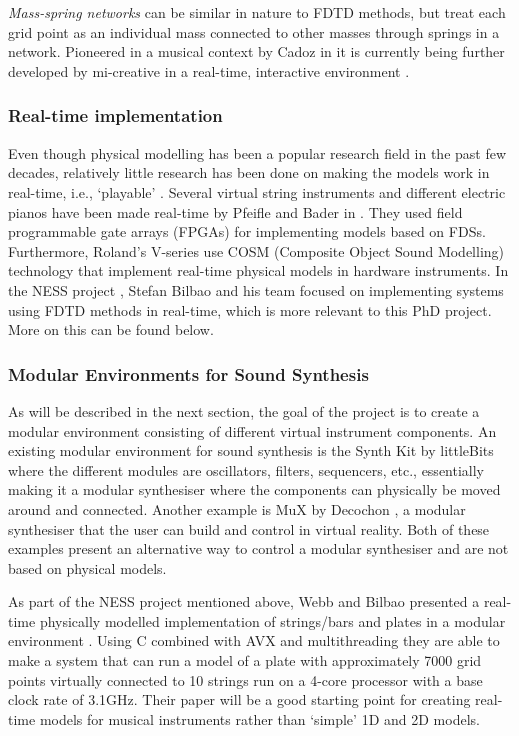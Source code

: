 \\
\\
\textit{Mass-spring networks} can be similar in nature to FDTD methods, but treat each grid point as an individual mass connected to other masses through springs in a network. Pioneered in a musical context by Cadoz in \cite{Cadoz1979, Cadoz1983, Cadoz1993} it is currently being further developed by mi-creative in a real-time, interactive environment \cite{Villeneuve2019, Leonard2019}. 

\subsubsection*{Real-time implementation}
Even though physical modelling has been a popular research field in the past few decades, relatively little research has been done on making the models work in real-time, i.e., `playable’ \cite{Mehes2016}. Several virtual string instruments and different electric pianos have been made real-time by Pfeifle and Bader in \cite{Pfeifle2012, Pfeifle2015, Pfeifle2017}. They used field programmable gate arrays (FPGAs) for implementing models based on FDSs. Furthermore, Roland’s V-series use COSM (Composite Object Sound Modelling) technology \cite{Bybee2019} that implement real-time physical models in hardware instruments. In the NESS project \cite{NESS2016}, Stefan Bilbao and his team focused on implementing systems using FDTD methods in real-time, which is more relevant to this PhD project. More on this can be found below.

\subsubsection*{Modular Environments for Sound Synthesis}

As will be described in the next section, the goal of the project is to create a modular environment consisting of different virtual instrument components. An existing modular environment for sound synthesis is the Synth Kit by littleBits \cite{littleBits2019} where the different modules are oscillators, filters, sequencers, etc., essentially making it a modular synthesiser where the components can physically be moved around and connected. Another example is MuX by Decochon \cite{MuX2019}, a modular synthesiser that the user can build and control in virtual reality. Both of these examples present an alternative way to control a modular synthesiser and are not based on physical models.

As part of the NESS project mentioned above, Webb and Bilbao presented a real-time physically modelled implementation of strings/bars and plates in a modular environment \cite{Webb2015}. Using C combined with AVX and multithreading they are able to make a system that can run a model of a plate with approximately 7000 grid points virtually connected to 10 strings run on a 4-core processor with a base clock rate of 3.1GHz. Their paper will be a good starting point for creating real-time models for musical instruments rather than ‘simple’ 1D and 2D models.

